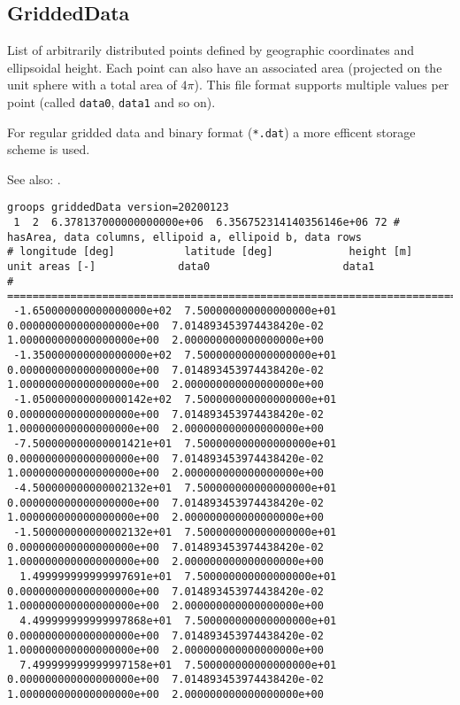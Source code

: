 \subsection{GriddedData}\label{general.fileFormat:griddedData}
List of arbitrarily distributed points defined by geographic coordinates and ellipsoidal
height. Each point can also have an associated area
(projected on the unit sphere with a total area of $4\pi$).
This file format supports multiple values per point (called \verb|data0|, \verb|data1| and so on).

For regular gridded data and binary format (\verb|*.dat|) a more efficent storage scheme is used.

See also: .

\begin{verbatim}
groops griddedData version=20200123
 1  2  6.378137000000000000e+06  6.356752314140356146e+06 72 # hasArea, data columns, ellipoid a, ellipoid b, data rows
# longitude [deg]           latitude [deg]            height [m]                unit areas [-]             data0                     data1
# ===========================================================================================================================================================
 -1.650000000000000000e+02  7.500000000000000000e+01  0.000000000000000000e+00  7.014893453974438420e-02  1.000000000000000000e+00  2.000000000000000000e+00
 -1.350000000000000000e+02  7.500000000000000000e+01  0.000000000000000000e+00  7.014893453974438420e-02  1.000000000000000000e+00  2.000000000000000000e+00
 -1.050000000000000142e+02  7.500000000000000000e+01  0.000000000000000000e+00  7.014893453974438420e-02  1.000000000000000000e+00  2.000000000000000000e+00
 -7.500000000000001421e+01  7.500000000000000000e+01  0.000000000000000000e+00  7.014893453974438420e-02  1.000000000000000000e+00  2.000000000000000000e+00
 -4.500000000000002132e+01  7.500000000000000000e+01  0.000000000000000000e+00  7.014893453974438420e-02  1.000000000000000000e+00  2.000000000000000000e+00
 -1.500000000000002132e+01  7.500000000000000000e+01  0.000000000000000000e+00  7.014893453974438420e-02  1.000000000000000000e+00  2.000000000000000000e+00
  1.499999999999997691e+01  7.500000000000000000e+01  0.000000000000000000e+00  7.014893453974438420e-02  1.000000000000000000e+00  2.000000000000000000e+00
  4.499999999999997868e+01  7.500000000000000000e+01  0.000000000000000000e+00  7.014893453974438420e-02  1.000000000000000000e+00  2.000000000000000000e+00
  7.499999999999997158e+01  7.500000000000000000e+01  0.000000000000000000e+00  7.014893453974438420e-02  1.000000000000000000e+00  2.000000000000000000e+00

\end{verbatim}
